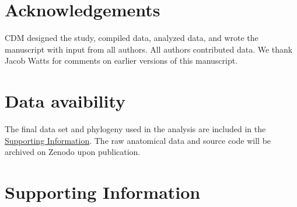 \documentclass[
  10pt,
]{article}
\begin{document}
\hypertarget{acknowledgements}{%
\section{Acknowledgements}\label{acknowledgements}}

CDM designed the study, compiled data, analyzed data, and wrote the manuscript with input from all authors. All authors contributed data. We thank Jacob Watts for comments on earlier versions of this manuscript.

\hypertarget{data-avaibility}{%
\section{Data avaibility}\label{data-avaibility}}

The final data set and phylogeny used in the analysis are included in the \protect\hyperlink{supporting-information}{Supporting Information}. The raw anatomical data and source code will be archived on Zenodo upon publication.

\clearpage

\hypertarget{supporting-information}{%
\section{Supporting Information}\label{supporting-information}}

\renewcommand\thefigure{S\arabic{figure}}    
\renewcommand\thetable{S\arabic{table}}    
\setcounter{figure}{0}    
\setcounter{table}{0}
\end{document}
